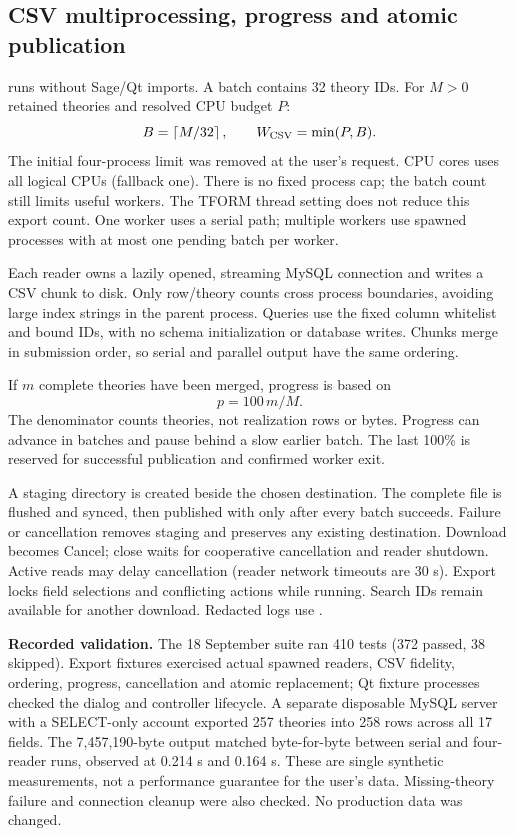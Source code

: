 \subsection{CSV multiprocessing, progress and atomic publication}
\label{sec:csv-export}
 runs without Sage/Qt imports. A batch contains
32 theory IDs. For $M>0$ retained theories and resolved CPU budget $P$:
\[
 B=\left\lceil M/32\right\rceil,\qquad W_{\rm CSV}=\min(P,B).
\]
The initial four-process limit was removed at the user's request. CPU cores
 uses all logical CPUs (fallback one). There is no fixed process cap;
the batch count still limits useful workers. The TFORM thread setting does
not reduce this export count. One worker uses a serial path; multiple workers
use spawned processes with at most one pending batch per worker.

Each reader owns a lazily opened, streaming MySQL connection and writes a CSV
chunk to disk. Only row/theory counts cross process boundaries, avoiding large
index strings in the parent process. Queries use the fixed column whitelist
and bound IDs, with no schema initialization or database writes. Chunks merge
in submission order, so serial and parallel output have the same ordering.

If $m$ complete theories have been merged, progress is based on
\[
 p=100\,m/M.
\]
The denominator counts theories, not realization rows or bytes. Progress can
advance in batches and pause behind a slow earlier batch. The last 100\% is
reserved for successful publication and confirmed worker exit.

A staging directory is created beside the chosen destination. The complete
file is flushed and synced, then published with  only after
every batch succeeds. Failure or cancellation removes staging and preserves
any existing destination. Download becomes Cancel; close waits for cooperative
cancellation and reader shutdown. Active reads may delay cancellation (reader
network timeouts are 30 s). Export locks field selections and conflicting
actions while running. Search IDs remain available for another download.
Redacted logs use .

\textbf{Recorded validation.} The 18 September suite ran 410 tests
(372 passed, 38 skipped). Export fixtures exercised actual spawned readers,
CSV fidelity, ordering, progress, cancellation and atomic replacement;
Qt fixture processes checked the dialog and controller lifecycle. A separate
disposable MySQL server with a SELECT-only account exported 257 theories into
258 rows across all 17 fields. The 7,457,190-byte output matched byte-for-byte
between serial and four-reader runs, observed at 0.214 s and 0.164 s.
These are single synthetic measurements, not a performance guarantee for the
user's data. Missing-theory failure and connection cleanup were also checked.
No production data was changed.

